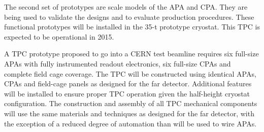 The second set of prototypes are scale models of the APA and CPA. They
are being used to validate the designs and to evaluate production
procedures. These functional prototypes will be installed in the 35-t
prototype cryostat. This TPC is expected to be operational in 2015.

A TPC prototype proposed to go into a CERN test beamline
requires six full-size APAs with fully instrumented readout electronics,
six full-size CPAs and complete field cage coverage. The TPC will be
constructed using identical APAs, CPAs and field-cage panels as
designed for the far detector. Additional features will be installed
to ensure proper TPC operation given the half-height cryostat
configuration. The construction and assembly of all TPC mechanical
components will use the same materials and techniques as designed for
the far detector, with the exception of a reduced degree of automation
than will be used to wire APAs.
